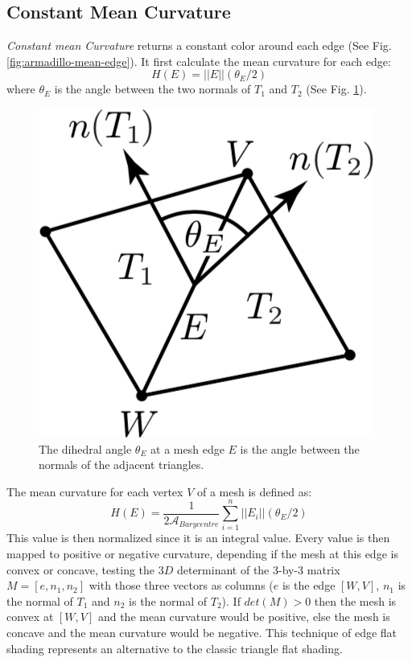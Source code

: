 \subsection{Constant Mean Curvature}
\textit{Constant mean Curvature} returns a constant color around each edge (See Fig. \ref{fig:armadillo-mean-edge}). It first calculate the mean curvature for each edge:
$$H(E) = || E|| (\theta_E /2)$$
where $\theta_E$ is the angle between the two normals of $T_1$ and $T_2$ (See Fig. \ref{fig:mean-edge}).
\begin{figure}[H]
    \centering
    \includegraphics[scale=0.6]{images/mean-edge-theta.png}
    \caption{The dihedral angle $\theta_E$ at a mesh edge $E$ is the angle between the normals of the adjacent triangles. \cite{geometryprocessing}}\label{fig:mean-edge}
\end{figure}
The mean curvature for each vertex $V$ of a mesh is defined as:
$$H(E) = \frac{1}{2\mathcal{A}_{Barycentre}} \sum_{i = 1}^n ||E_i||(\theta_E/2)$$
This value is then normalized since it is an integral value. Every value is then mapped to positive or negative curvature, depending if the mesh at this edge is convex or concave, testing the $3D$ determinant of the 3-by-3 matrix $M = [e, n_1, n_2]$ with those three vectors as
columns ($e$ is the edge $[W, V]$, $n_1$ is the normal of $T_1$ and $n_2$ is the normal of $T_2$). If $det(M) > 0$ then the mesh is convex at $[W, V]$ and the mean curvature would be positive, else the mesh is concave and the mean curvature would be negative. This technique of edge flat shading represents an alternative to the classic triangle flat shading.

